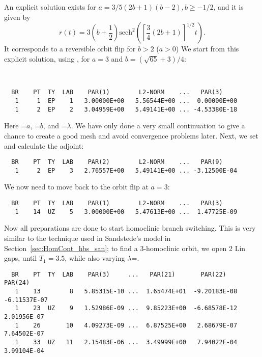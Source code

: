 \documentclass[12pt]{report}
\begin{document}
An explicit solution exists for $a=3/5(2b+1)(b-2), b\geq -1/2$, and it is
given by 
\[r(t)=3(b+\frac{1}{2})\mathrm{sech}^2\left([\frac{3}{4}(2b+1)]^{1/2}t\right).\]
It corresponds to a reversible orbit flip for $b>2$ ($a>0$) 
We start from this explicit solution, using , for $a=3$ and
$b=(\sqrt{65}+3)/4$:

\begin{center}
\\
\end{center}
\begin{verbatim}
  BR    PT  TY  LAB    PAR(1)        L2-NORM    ...   PAR(3)     
   1     1  EP    1   3.00000E+00   5.56544E+00 ...  0.00000E+00
   1     2  EP    2   3.04959E+00   5.49141E+00 ... -4.53380E-18
\end{verbatim}
Here =$a$, =$b$, and
=$\lambda$. We have only done a
very small continuation to give \AUTO a chance to create a good mesh
and avoid convergence problems later.
Next, we set  and calculate the adjoint:
\begin{center}
\end{center}
\begin{verbatim}
  BR    PT  TY  LAB    PAR(2)        L2-NORM    ...   PAR(9)
   1     2  EP    3   2.76557E+00   5.49141E+00 ... -3.12500E-04
\end{verbatim}
We now need to move back to the orbit flip at $a=3$:
\begin{center}
\end{center}
\begin{verbatim}
  BR    PT  TY  LAB    PAR(1)        L2-NORM    ...   PAR(3)     
   1    14  UZ    5   3.00000E+00   5.47613E+00 ...  1.47725E-09
\end{verbatim}
Now all preparations are done to start homoclinic branch
switching. This is very similar to the technique used in 
Sandstede's model in Section~\ref{sec:HomCont_hbs_san}; 
to find a 3-homoclinic orbit, we open 2 Lin gaps,
until $T_1=3.5$, while also varying $\lambda$=.
\begin{center}
\end{center}
\begin{verbatim}
  BR    PT  TY  LAB    PAR(3)     ...   PAR(21)       PAR(22)       PAR(24)
   1    13        8   5.85315E-10 ...  1.65474E+01  -9.20183E-08  -6.11537E-07
   1    23  UZ    9   1.52986E-09 ...  9.85223E+00  -6.68578E-12   2.01956E-07
   1    26       10   4.09273E-09 ...  6.87525E+00   2.68679E-07   7.64502E-07
   1    33  UZ   11   2.15483E-06 ...  3.49999E+00   7.94022E-04   3.99104E-04
\end{verbatim}
\end{document}
